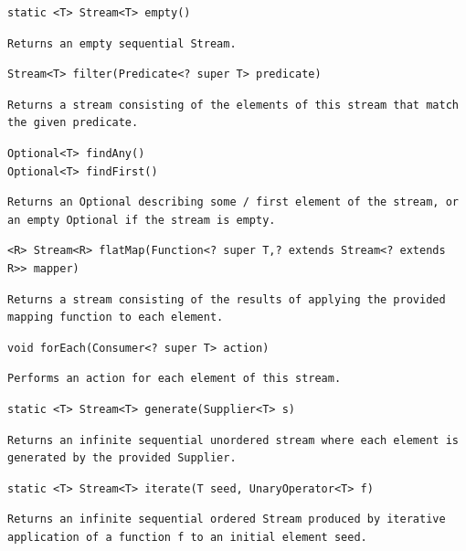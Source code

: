 \documentclass[5pt, portrait]{article}
\begin{document}
\begin{verbatim}
static <T> Stream<T> empty()
\end{verbatim}
\begin{verbatim}
Returns an empty sequential Stream.
\end{verbatim} 

\begin{verbatim}
Stream<T> filter(Predicate<? super T> predicate)
\end{verbatim}
\begin{verbatim}
Returns a stream consisting of the elements of this stream that match the given predicate.
\end{verbatim} 

\begin{verbatim}
Optional<T> findAny()
Optional<T> findFirst()
\end{verbatim}
\begin{verbatim}
Returns an Optional describing some / first element of the stream, or an empty Optional if the stream is empty.
\end{verbatim} 

\begin{verbatim}
<R> Stream<R> flatMap(Function<? super T,? extends Stream<? extends R>> mapper)
\end{verbatim}
\begin{verbatim}
Returns a stream consisting of the results of applying the provided mapping function to each element.
\end{verbatim} 

\begin{verbatim}
void forEach(Consumer<? super T> action)
\end{verbatim}
\begin{verbatim}
Performs an action for each element of this stream.
\end{verbatim} 

\begin{verbatim}
static <T> Stream<T> generate(Supplier<T> s)
\end{verbatim}
\begin{verbatim}
Returns an infinite sequential unordered stream where each element is generated by the provided Supplier.
\end{verbatim} 

\begin{verbatim}
static <T> Stream<T> iterate(T seed, UnaryOperator<T> f)
\end{verbatim}
\begin{verbatim}
Returns an infinite sequential ordered Stream produced by iterative application of a function f to an initial element seed.
\end{verbatim} 
\end{document}
